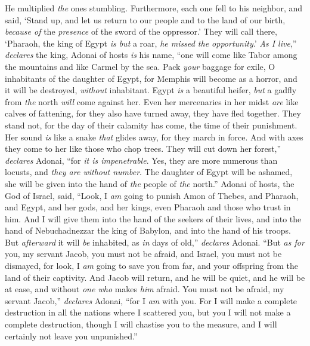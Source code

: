 \begin{biblechapter}
\verse He multiplied \textit{the} ones stumbling. 
Furthermore, each one fell to his neighbor, 
and said, ‘Stand up, and let us return to our people 
and to the land of our birth, 
\textit{because of} the \textit{presence} of the sword of the oppressor.’
\verse They will call there, 
‘Pharaoh, the king of Egypt \textit{is but} a roar, 
\textit{he missed the opportunity}.’
\verse \textit{As I live},” \textit{declares} the king, 
Adonai of hosts \textit{is} his name, 
“one will come like Tabor among the mountains 
and like Carmel by the sea.
\verse Pack \textit{your} baggage for exile, 
O inhabitants of the daughter of Egypt, 
for Memphis will become as a horror, 
and it will be destroyed, \textit{without} inhabitant.
\verse Egypt \textit{is} a beautiful heifer, 
\textit{but} a gadfly from \textit{the} north \textit{will} come against her.
\verse Even her mercenaries in her midst \textit{are} like calves of fattening, 
for they also have turned away, 
they have fled together. 
They stand not, 
for the day of their calamity has come, 
the time of their punishment.
\verse Her sound \textit{is} like a snake \textit{that} glides away, 
for they march in force. 
And with axes they come to her 
like those who chop trees.
\verse They will cut down her forest,” \textit{declares} Adonai, 
“for \textit{it is impenetrable}. 
Yes, they are more numerous than locusts, 
and \textit{they are without number}.
\verse The daughter of Egypt will be ashamed, 
she will be given into the hand of \textit{the} people of \textit{the} north.”
\verse Adonai of hosts, the God of Israel, said, “Look, I \textit{am} going to punish Amon of Thebes, and Pharaoh, and Egypt, and her gods, and her kings, even Pharaoh and those who trust in him.
\verse And I will give them into the hand of the seekers of their lives, and into the hand of Nebuchadnezzar the king of Babylon, and into the hand of his troops. But \textit{afterward} it will \textit{be} inhabited, as \textit{in} days of old,” \textit{declares} Adonai.
\verse “But \textit{as for} you, my servant Jacob, you must not be afraid, 
and Israel, you must not be dismayed, 
for look, I \textit{am} going to save you from far, 
and your offspring from the land of their captivity. 
And Jacob will return, 
and he will be quiet, 
and he will be at ease, 
and without \textit{one who} makes \textit{him} afraid.
\verse You must not be afraid, my servant Jacob,” \textit{declares} Adonai, 
“for I \textit{am} with you. 
For I will make a complete destruction in all the nations where I scattered you, 
but you I will not make a complete destruction, 
though I will chastise you to the measure, 
and I will certainly not leave you unpunished.”
\end{biblechapter}

